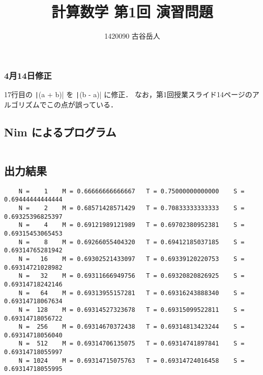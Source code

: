 \documentclass[uplatex,dvipdfmx,a4paper]{jsarticle}
\title{計算数学 第1回 演習問題}
\author{1420090 古谷岳人}
\begin{document}
  \maketitle

  \subsubsection*{4月14日修正}
  17行目の \texttt|(a + b)| を \texttt|(b - a)| に修正．
  なお，第1回授業スライド14ページのアルゴリズムでこの点が誤っている．
  \subsection*{Nim によるプログラム}
\inputminted[linenos]{nim}{Kadai01.nim}
  \subsection*{出力結果}
  \begin{verbatim}
    N =    1    M = 0.66666666666667   T = 0.75000000000000    S = 0.69444444444444
    N =    2    M = 0.68571428571429   T = 0.70833333333333    S = 0.69325396825397
    N =    4    M = 0.69121989121989   T = 0.69702380952381    S = 0.69315453065453
    N =    8    M = 0.69266055404320   T = 0.69412185037185    S = 0.69314765281942
    N =   16    M = 0.69302521433097   T = 0.69339120220753    S = 0.69314721028982
    N =   32    M = 0.69311666949756   T = 0.69320820826925    S = 0.69314718242146
    N =   64    M = 0.69313955157281   T = 0.69316243888340    S = 0.69314718067634
    N =  128    M = 0.69314527323678   T = 0.69315099522811    S = 0.69314718056722
    N =  256    M = 0.69314670372438   T = 0.69314813423244    S = 0.69314718056040
    N =  512    M = 0.69314706135075   T = 0.69314741897841    S = 0.69314718055997
    N = 1024    M = 0.69314715075763   T = 0.69314724016458    S = 0.69314718055995  \end{verbatim}
\end{document}

